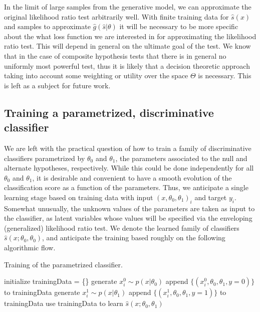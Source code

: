 \documentclass[11pt, oneside]{article}   	%
\begin{document}

In the  limit of large samples from the generative model,  we can approximate the original likelihood ratio test arbitrarily well. With finite training data for $\hat{s}(x)$ and samples to approximate $\hat{g}(\hat{s}|\theta)$ it will be necessary to be more specific about the what loss function we are interested in for approximating the likelihood ratio test. This will depend in general on the ultimate goal of the test. We know that in the case of composite hypothesis tests that there is in general no uniformly most powerful test, thus it is likely that a decision theoretic approach taking into account some weighting or utility over the space $\Theta$ is necessary. This is left as a subject for future work.


\subsection{Training a parametrized, discriminative classifier}

We are left with the practical question of how to train a family of discriminative classifiers parametrized by $\theta_0$ and $\theta_1$, the 
parameters associated to the null and alternate hypotheses, respectively. While this could be done independently
for all $\theta_0$ and $\theta_1$, it is desirable and convenient to have a smooth evolution of the classification score as a function of the parameters. Thus, we anticipate a single learning stage based on training data with input $(x, \theta_0, \theta_1)_i$ and target $y_i$. Somewhat unusually, the unknown values of the parameters are taken
as input to the classifier, as latent variables whose values will be specified via the enveloping (generalized) likelihood ratio test. We denote the learned family of classifiers $\hat{s}(x; \theta_0, \theta_0)$, and anticipate the training based roughly on the following algorithmic flow.
\begin{algorithm}[ht]
\caption{Training of the parametrized classifier.}\label{alg:training}
\begin{algorithmic}
\STATE initialize trainingData = \{\}
		\STATE generate $x_i^0 \sim p(x|\theta_0)$
		\STATE append $\{ (x_i^0, \theta_0, \theta_1, y=0) \}$ to trainingData
		\STATE generate $x_i^1 \sim p(x|\theta_1)$
		\STATE append $\{ (x_i^1, \theta_0, \theta_1, y=1) \}$ to trainingData
	\ENDFOR
\ENDFOR
\STATE use trainingData to learn $\hat{s}(x; \theta_0, \theta_1)$
\end{algorithmic}
\end{algorithm}%
\end{document}
